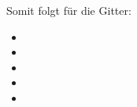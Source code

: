 Somit folgt f\"ur die Gitter:

\begin{itemize}
\item
\item
\item
\item
\item
\end{itemize}





























